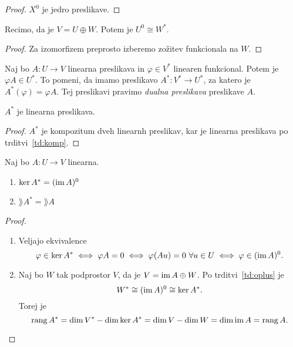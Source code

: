 \documentclass[12pt, a4paper]{article}
\begin{document}
\begin{proof}
$X^0$ je jedro preslikave.
\end{proof}

\begin{trditev}\label{td:oplus}
Recimo, da je $V=U\oplus W$. Potem je $U^0\cong W^*$.
\end{trditev}

\begin{proof}
Za izomorfizem preprosto izberemo zožitev funkcionala na $W$.
\end{proof}

\begin{definicija}
Naj bo $A\colon U\to V$ linearna preslikava in $\varphi\in V^*$ linearen funkcional. Potem je $\varphi A\in U^*$. To pomeni, da imamo preslikavo $A^*\colon V^*\to U^*$, za katero je $A^*(\varphi)=\varphi A$. Tej preslikavi pravimo \emph{dualna preslikava} preslikave $A$.
\end{definicija}

\begin{trditev}
$A^*$ je linearna preslikava.
\end{trditev}

\begin{proof}
$A^*$ je kompozitum dveh linearnh preslikav, kar je linearna preslikava po trditvi~\ref{td:komp}.
\end{proof}

\begin{izrek}\label{iz:rang}
Naj bo $A\colon U\to V$ linearna.
\begin{enumerate}[label=\roman*)]
\item $\ker A^*=(\operatorname{im} A)^0$
\item $\rang A^*=\rang A$
\end{enumerate}
\end{izrek}

\begin{proof}
\begin{enumerate}[label=\roman*)]
\item Veljajo ekvivalence
\[
\varphi\in\ker A^*\iff \varphi A=0\iff \varphi(Au)=0~\forall u\in U\iff \varphi\in(\operatorname{im} A)^0.
\]
\item Naj bo $W$ tak podprostor $V$, da je $V=\operatorname{im} A\oplus W$. Po trditvi~\ref{td:oplus} je
\[
W^*\cong (\operatorname{im} A)^0\cong\ker A^*.
\]
Torej je
\[
\operatorname{rang} A^*=\dim V^*-\dim\ker A^*=\dim V-\dim W=\dim\operatorname{im} A=\operatorname{rang} A.\qedhere
\]
\end{enumerate}
\end{proof}
\end{document}
